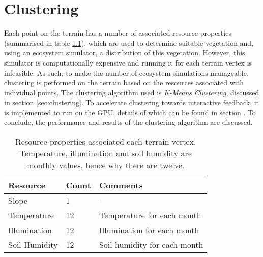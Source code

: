 \chapter{Clustering}

Each point on the terrain has a number of associated resource properties (summarised in table \ref{tab:point_resources}), which are used to determine suitable vegetation and, using an ecosystem simulator, a distribution of this vegetation. However, this simulator is computationally expensive and running it for each terrain vertex is infeasible. As such, to make the number of ecosystem simulations manageable, clustering is performed on the terrain based on the resources associated with individual points. The clustering algorithm used is \textit{K-Means Clustering}, discussed in section \ref{sec:clustering}. To accelerate clustering towards interactive feedback, it is implemented to run on the GPU, details of which can be found in section \label{sec:gpu_clustering}. To conclude, the performance and results of the clustering algorithm are discussed.

\begin{table}[h]
  \centering
	    \begin{tabular}{|p{6cm}|p{3cm}|p{6cm}|}
		\hline	
  	    \textbf{Resource} & \textbf{Count} & \textbf{Comments} \\
  	    \hline	
  	    Slope & 1 & - \\
		\hline
  	    Temperature & 12 & Temperature for each month \\
		\hline
  	    Illumination & 12 & Illumination for each month \\
		\hline
  	    Soil Humidity & 12 & Soil humidity for each month \\
		\hline
		\end{tabular}
		\caption{Resource properties associated each terrain vertex. Temperature, illumination and soil humidity are monthly values, hence why there are twelve.}
	  \label{tab:point_resources}
\end{table}



